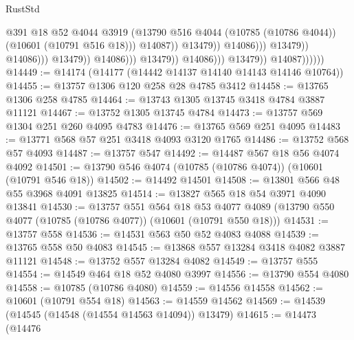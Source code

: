 \begin{lexlean}{RustStd}
\begin{coremodule}
                                                                @391
                                                                @18
                                                                @52
                                                                @4044
                                                                @3919
                                                                (@13790
                                                                  @516
                                                                  @4044
                                                                  (@10785 (@10786 @4044))
                                                                  (@10601 (@10791 @516 @18)))
                                                                @14087))
                                                            @13479))
                                                        @14086)))
                                                  @13479))
                                              @14086)))
                                        @13479))
                                    @14086)))
                              @13479))
                          @14086)))
                    @13479))
                @14087))))))
@14449 := @14174 (@14177 (@14442 @14137 @14140 @14143 @14146 @10764))
@14455 := @13757 @1306 @120 @258 @28 @4785 @3412
@14458 := @13765 @1306 @258 @4785
@14464 := @13743 @1305 @13745 @3418 @4784 @3887 @11121
@14467 := @13752 @1305 @13745 @4784
@14473 := @13757 @569 @1304 @251 @260 @4095 @4783
@14476 := @13765 @569 @251 @4095
@14483 := @13771 @568 @57 @251 @3418 @4093 @3120 @1765
@14486 := @13752 @568 @57 @4093
@14487 := @13757 @547
@14492 := @14487 @567 @18 @56 @4074 @4092
@14501 := @13790 @546 @4074 (@10785 (@10786 @4074)) (@10601 (@10791 @546 @18))
@14502 := @14492 @14501
@14508 := @13801 @566 @48 @55 @3968 @4091 @13825
@14514 := @13827 @565 @18 @54 @3971 @4090 @13841
@14530 := @13757
    @551
    @564
    @18
    @53
    @4077
    @4089
    (@13790 @550 @4077 (@10785 (@10786 @4077)) (@10601 (@10791 @550 @18)))
@14531 := @13757 @558
@14536 := @14531 @563 @50 @52 @4083 @4088
@14539 := @13765 @558 @50 @4083
@14545 := @13868 @557 @13284 @3418 @4082 @3887 @11121
@14548 := @13752 @557 @13284 @4082
@14549 := @13757 @555
@14554 := @14549 @464 @18 @52 @4080 @3997
@14556 := @13790 @554 @4080
@14558 := @10785 (@10786 @4080)
@14559 := @14556 @14558
@14562 := @10601 (@10791 @554 @18)
@14563 := @14559 @14562
@14569 := @14539 (@14545 (@14548 (@14554 @14563 @14094)) @13479)
@14615 := @14473
    (@14476

\end{coremodule}
\end{lexlean}
